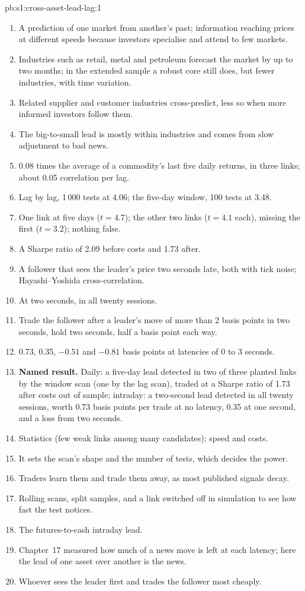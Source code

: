 \begin{solution}{pb:s1:cross-asset-lead-lag:1}
\begin{enumerate}
\item A prediction of one market from another's past; information reaching prices at different speeds because investors specialise and attend to
few markets.
\item Industries such as retail, metal and petroleum forecast the market by up to two months; in the extended sample a robust core still does, but
fewer industries, with time variation.
\item Related supplier and customer industries cross-predict, less so when more informed investors follow them.
\item The big-to-small lead is mostly within industries and comes from slow adjustment to bad news.
\item 0.08 times the average of a commodity's last five daily returns, in three links; about 0.05 correlation per lag.
\item Lag by lag, 1\,000 tests at 4.06; the five-day window, 100 tests at 3.48.
\item One link at five days ($t = 4.7$); the other two links ($t = 4.1$ each), missing the first ($t = 3.2$); nothing false.
\item A Sharpe ratio of 2.09 before costs and 1.73 after.
\item A follower that sees the leader's price two seconds late, both with tick noise; Hayashi--Yoshida cross-correlation.
\item At two seconds, in all twenty sessions.
\item Trade the follower after a leader's move of more than 2 basis points in two seconds, hold two seconds, half a basis point each way.
\item 0.73, 0.35, $-0.51$ and $-0.81$ basis points at latencies of 0 to 3 seconds.
\item \textbf{Named result.} Daily: a five-day lead detected in two of three planted links by the window scan (one by the lag scan), traded at a Sharpe ratio
of 1.73 after costs out of sample; intraday: a two-second lead detected in all twenty sessions, worth 0.73 basis points per trade at no latency, 0.35 at
one second, and a loss from two seconds.
\item Statistics (few weak links among many candidates); speed and costs.
\item It sets the scan's shape and the number of tests, which decides the power.
\item Traders learn them and trade them away, as most published signals decay.
\item Rolling scans, split samples, and a link switched off in simulation to see how fast the test notices.
\item The futures-to-cash intraday lead.
\item Chapter~17 measured how much of a news move is left at each latency; here the lead of one asset over another is the news.
\item Whoever sees the leader first and trades the follower most cheaply.
\end{enumerate}
\end{solution}

